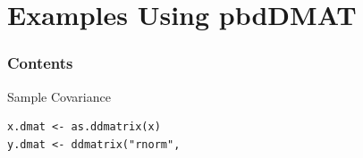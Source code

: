 \section[pbdDMAT eg's]{Examples Using pbdDMAT}
\setcounter{excount}{0}


\hidenum
\begin{frame}[noframenumbering]
\frametitle{Contents}
 \tableofcontents[currentsection,hideothersubsections,sectionstyle=show/hide]
\end{frame}
\shownum



\begin{frame}[fragile]
  \begin{exampleblock}{Sample Covariance}\pause
\begin{lstlisting}[title=Creating DMAT Objects]
x.dmat <- as.ddmatrix(x)
y.dmat <- ddmatrix("rnorm", 
\end{lstlisting}
  \end{exampleblock}
\end{frame}



